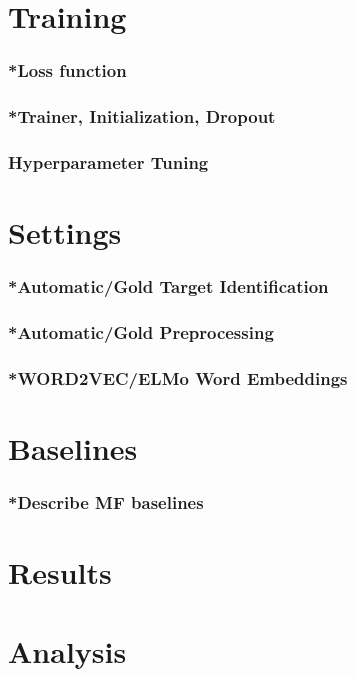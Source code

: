 \section{Training} \label{sec:psstraining}
\subsubsection{*Loss function}
\subsubsection{*Trainer, Initialization, Dropout}
\subsubsection{Hyperparameter Tuning}

\section{Settings} \label{sec:psssettings}
\subsubsection{*Automatic/Gold Target Identification}
\subsubsection{*Automatic/Gold Preprocessing}
\subsubsection{*WORD2VEC/ELMo Word Embeddings}

\section{Baselines} \label{sec:pssbaselines}
\subsubsection{*Describe MF baselines}

\section{Results} \label{sec:pssresults}

\section{Analysis} \label{sec:pssanalysis}
